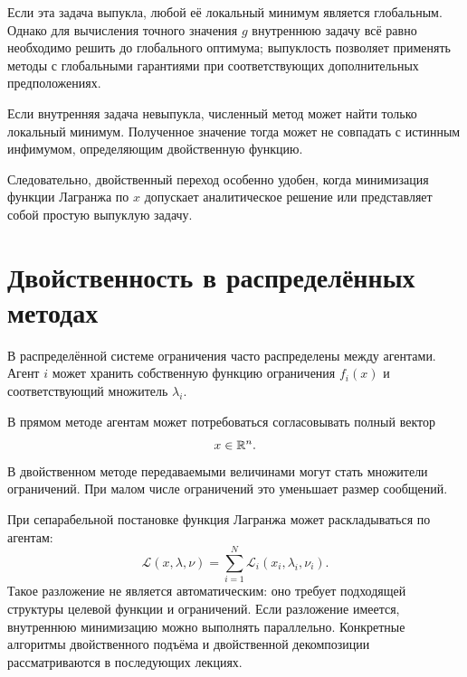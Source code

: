 Если эта задача выпукла, любой её локальный минимум является
глобальным. Однако для вычисления точного значения \(g\) внутреннюю
задачу всё равно необходимо решить до глобального оптимума; выпуклость
позволяет применять методы с глобальными гарантиями при
соответствующих дополнительных предположениях.

Если внутренняя задача невыпукла, численный метод может найти только
локальный минимум. Полученное значение тогда может не совпадать с
истинным инфимумом, определяющим двойственную функцию.

Следовательно, двойственный переход особенно удобен, когда
минимизация функции Лагранжа по \(x\) допускает аналитическое решение
или представляет собой простую выпуклую задачу.

\section{Двойственность в распределённых методах}

В распределённой системе ограничения часто распределены между
агентами. Агент \(i\) может хранить собственную функцию ограничения
\(f_i(x)\) и соответствующий множитель \(\lambda_i\).

В прямом методе агентам может потребоваться согласовывать полный
вектор
\[
    x\in\mathbb{R}^n.
\]
В двойственном методе передаваемыми величинами могут стать
множители ограничений. При малом числе ограничений это уменьшает
размер сообщений.

При сепарабельной постановке функция Лагранжа может раскладываться
по агентам:
\[
    \mathcal L(x,\lambda,\nu)
    =
    \sum_{i=1}^{N}\mathcal L_i(x_i,\lambda_i,\nu_i).
\]
Такое разложение не является автоматическим: оно требует подходящей
структуры целевой функции и ограничений. Если разложение имеется,
внутреннюю минимизацию можно выполнять параллельно. Конкретные
алгоритмы двойственного подъёма и двойственной декомпозиции
рассматриваются в последующих лекциях.



